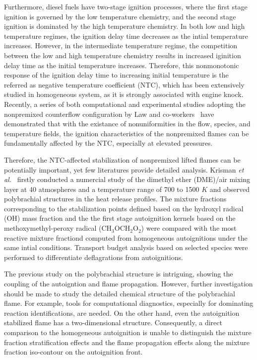 \documentclass[review,3p,times]{elsarticleUS}
\begin{document}
Furthermore, diesel fuels have two-stage ignition processes, where the first stage ignition is governed by the low temperature chemistry, and the second stage ignition is dominated by the high temperature chemistry.  In both low and high temperature regimes, the ignition delay time decreases as the intial temperature increases.  However, in the intermediate temperature regime, the competition between the low and high temperature chemistry results in increased iginition delay time as the initial temperature increases.  Therefore, this nonmonotonic response of the ignition delay time to increasing initial temperature is the referred as negative temperature coefficient (NTC), which has been extensively studied in homogeneous system, as it is strongly associated with engine knock.  Recently, a series of both computational and experimental studies adopting the nonpremixed counterflow configuration by Law and co-workers~\cite{law12,zhao13,deng14} have demonstrated that with the existance of nonuniformities in the flow, species, and temperature fields, the ignition characteristics of the nonpremixed flames can be fundamentally affected by the NTC, especially at elevated pressures.   

Therefore, the NTC-affected stabilization of nonpremixed lifted flames can be potentially important, yet few literatures provide detailed analysis.  Krisman \emph{et al.}~\cite{krisman14} firstly conducted a numercial study of the dimethyl ether (DME)/air mixing layer at 40 atmospheres and a temperature range of 700 to 1500 $K$ and observed polybrachial structures in the heat release profiles.  The mixture fractions corresponding to the stabilization points defined based on the hydroxyl radical (OH) mass fraction and the the first stage autoignition kernels based on the methoxymethyl-peroxy radical (CH$_3$OCH$_2$O$_2$) were compared with the most reactive mixture fractiond computed from homogeneous autoignitions under the same intial conditions.  Transport budget analysis based on selected species were performed to differentiate deflagrations from autoignitions.

The previous study on the polybrachial structure is intriguing, showing the coupling of the autoigntion and flame propagation.  However, further investigation should be made to study the detailed chemical structure of the polybrachial flame.  For example, tools for computational diagnostics, especially for dominating reaction identifications, are needed.  On the other hand, even the autoignition stabilized flame has a two-dimensional structure. Consequently, a direct comparison to the homogeneous autoignition is unable to distinguish the mixture fraction stratification effects and the flame propagation effects along the mixture fraction iso-contour on the autoignition front.     
\end{document}
